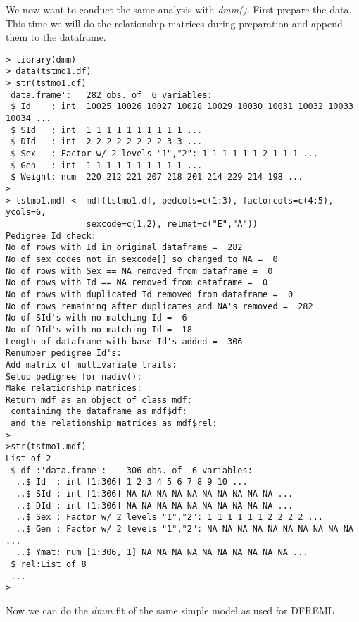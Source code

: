\documentclass[titlepage]{article}  %
\begin{document}
We now want to conduct the same analysis with {\em dmm()}.  First prepare the data. This time we will do the relationship matrices during preparation and append them to the dataframe.

\begin{verbatim}
> library(dmm)
> data(tstmo1.df)
> str(tstmo1.df)
'data.frame':	282 obs. of  6 variables:
 $ Id    : int  10025 10026 10027 10028 10029 10030 10031 10032 10033 10034 ...
 $ SId   : int  1 1 1 1 1 1 1 1 1 1 ...
 $ DId   : int  2 2 2 2 2 2 2 2 3 3 ...
 $ Sex   : Factor w/ 2 levels "1","2": 1 1 1 1 1 1 2 1 1 1 ...
 $ Gen   : int  1 1 1 1 1 1 1 1 1 1 ...
 $ Weight: num  220 212 221 207 218 201 214 229 214 198 ...
> 
> tstmo1.mdf <- mdf(tstmo1.df, pedcols=c(1:3), factorcols=c(4:5), ycols=6,
                sexcode=c(1,2), relmat=c("E","A"))
Pedigree Id check:
No of rows with Id in original dataframe =  282 
No of sex codes not in sexcode[] so changed to NA =  0 
No of rows with Sex == NA removed from dataframe =  0 
No of rows with Id == NA removed from dataframe =  0 
No of rows with duplicated Id removed from dataframe =  0 
No of rows remaining after duplicates and NA's removed =  282 
No of SId's with no matching Id =  6 
No of DId's with no matching Id =  18 
Length of dataframe with base Id's added =  306 
Renumber pedigree Id's:
Add matrix of multivariate traits:
Setup pedigree for nadiv():
Make relationship matrices:
Return mdf as an object of class mdf:
 containing the dataframe as mdf$df:
 and the relationship matrices as mdf$rel:
> 
>str(tstmo1.mdf)
List of 2
 $ df :'data.frame':	306 obs. of  6 variables:
  ..$ Id  : int [1:306] 1 2 3 4 5 6 7 8 9 10 ...
  ..$ SId : int [1:306] NA NA NA NA NA NA NA NA NA NA ...
  ..$ DId : int [1:306] NA NA NA NA NA NA NA NA NA NA ...
  ..$ Sex : Factor w/ 2 levels "1","2": 1 1 1 1 1 1 2 2 2 2 ...
  ..$ Gen : Factor w/ 2 levels "1","2": NA NA NA NA NA NA NA NA NA NA ...
  ..$ Ymat: num [1:306, 1] NA NA NA NA NA NA NA NA NA NA ...
 $ rel:List of 8
 ...
> 
\end{verbatim}
 
Now we can do the {\em dmm} fit of the same simple model as used for DFREML
\end{document}
